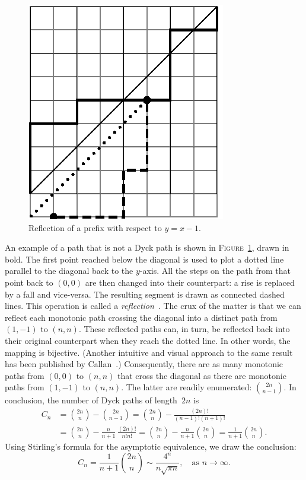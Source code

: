 \documentclass[11pt]{article}
\newcommand\fig{\textsc{Figure}}
\begin{document}
%
\begin{figure}
\centering
\includegraphics[scale=0.9]{reflection}
\caption{Reflection of a prefix with respect to \(y = x - 1\).
\label{fig:reflection}}
\end{figure}
An example of a path that is not a Dyck path is shown in
\fig~\ref{fig:reflection},
drawn in bold. The first point reached below the diagonal is used to
plot a dotted line parallel to the diagonal back to the $y$-axis. All
the steps on the path from that point back to \((0,0)\) are then
changed into their counterpart: a rise is replaced by a fall and
vice-versa. The resulting segment is drawn as connected dashed
lines. This operation is called a
\emph{reflection}~\cite{Renault:2008}. The crux of the matter is that
we can reflect each monotonic path crossing the diagonal into a
distinct path from \((1,-1)\) to \((n,n)\). These reflected paths can,
in turn, be reflected back into their original counterpart when they
reach the dotted line. In other words, the mapping is
bijective. (Another intuitive and visual approach to the same result
has been published by Callan~\cite{Callan:1995}.)  Consequently, there
are as many monotonic paths from \((0,0)\) to \((n,n)\) that cross the
diagonal as there are monotonic paths from \((1,-1)\) to
\((n,n)\). The latter are readily enumerated: \(\binom{2n}{n-1}\). In
conclusion, the number of Dyck paths of length~\(2n\) is
\begin{align}
C_n &= \binom{2n}{n} - \binom{2n}{n-1}
= \binom{2n}{n} - \frac{(2n)!}{(n-1)!(n+1)!}\label{eq:C}\\
&= \binom{2n}{n} - \frac{n}{n+1} \, \frac{(2n)!}{n!n!}
 = \binom{2n}{n} - \frac{n}{n+1} \binom{2n}{n} = \frac{1}{n+1}\binom{2n}{n}.\nonumber
\end{align}
Using Stirling's formula for the asymptotic equivalence, we draw the conclusion:
\begin{equation}
C_n = \frac{1}{n+1}\binom{2n}{n} \sim \frac{4^n}{n\sqrt{\pi n}},
      \quad\text{as \(n \rightarrow \infty\)}.
\label{eq:Cn}
\end{equation}
\end{document}
